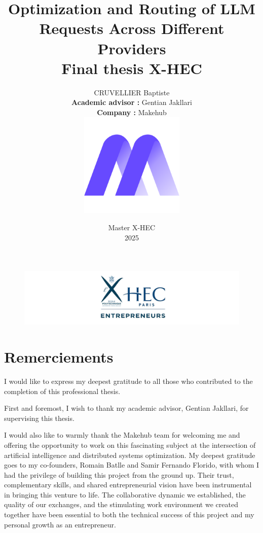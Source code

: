 \documentclass[english]{article}
\begin{document}
\begin{figure}[t]
\centering
\includegraphics[width=16cm]{images/x-hec-upscale.jpeg}
\end{figure}

\title{\vspace{1cm} \textbf{Optimization and Routing of LLM Requests Across Different Providers}\\ \vspace{0.5cm} \textbf{Final thesis X-HEC}}
\author{
    CRUVELLIER Baptiste\\[1em]
    \textbf{Academic advisor :} Gentian Jakllari\\
    \textbf{Company :} Makehub\\[1em]
    \includegraphics[width=5cm]{images/logo_makehub.png}
}
\date{\vspace{1cm} Master X-HEC\\
2025 }

\maketitle
\newpage

\section*{Remerciements}

I would like to express my deepest gratitude to all those who contributed to the completion of this professional thesis.

First and foremost, I wish to thank my academic advisor, Gentian Jakllari, for supervising this thesis.

I would also like to warmly thank the Makehub team for welcoming me and offering the opportunity to work on this fascinating subject at the intersection of artificial intelligence and distributed systems optimization. My deepest gratitude goes to my co-founders, Romain Batlle and Samir Fernando Florido, with whom I had the privilege of building this project from the ground up. Their trust, complementary skills, and shared entrepreneurial vision have been instrumental in bringing this venture to life. The collaborative dynamic we established, the quality of our exchanges, and the stimulating work environment we created together have been essential to both the technical success of this project and my personal growth as an entrepreneur.
\end{document}
